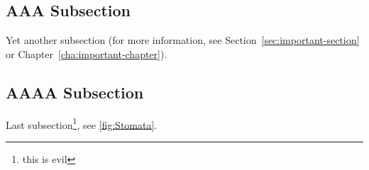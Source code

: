 \subsection{AAA Subsection}
Yet another subsection (for more information, see Section~\ref{sec:important-section} or Chapter~\ref{cha:important-chapter}).

\subsection{AAAA Subsection}
Last subsection\footnote{this is evil}, see \ref{fig:Stomata}.



